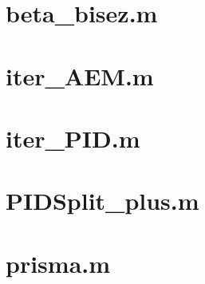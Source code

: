 \section{beta\_bisez.m}


\section{iter\_AEM.m}


\section{iter\_PID.m}


\section{PIDSplit\_plus.m}


\section{prisma.m}


